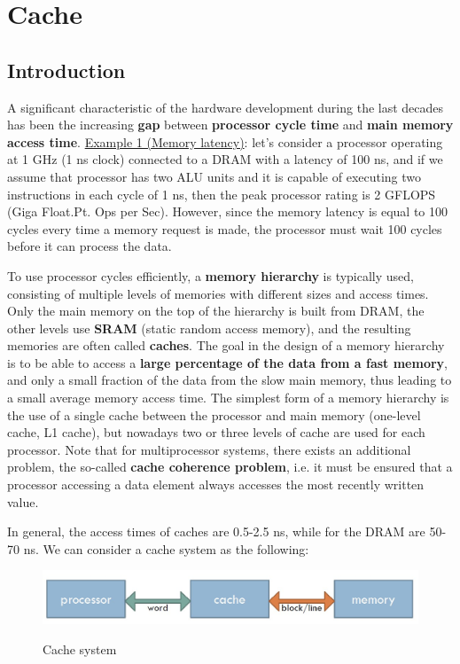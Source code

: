 \newpage
\section{Cache}

\subsection{Introduction}

A significant characteristic of the hardware development during the last decades has been the increasing \textbf{gap} between \textbf{processor cycle time} and \textbf{main memory access time}. 
\underline{Example 1 (Memory latency)}: let's consider a processor operating at 1 GHz (1 ns clock) connected to a DRAM with a latency of 100 ns, and if we assume that processor has two ALU units and it is capable of executing two instructions in each cycle of 1 ns, then the peak processor rating is 2 GFLOPS (Giga Float.Pt. Ops per Sec). However, since the memory latency is equal to 100 cycles every time a memory request is made, the processor must wait 100 cycles before it can process the data.

To use processor cycles efficiently, a \textbf{memory hierarchy} is typically used, consisting of multiple levels of memories with different sizes and access times. Only the main memory on the top of the hierarchy is built from DRAM, the other levels use \textbf{SRAM} (static random access memory), and the resulting memories are often called \textbf{caches}. The goal in the design of a memory hierarchy is to be able to access a \textbf{large percentage of the data from a fast memory}, and only a small fraction of the data from the slow main memory, thus leading to a small average memory access time. The simplest form of a memory hierarchy is the use of a single cache between the processor and main memory (one-level cache, L1 cache), but nowadays two or three levels of cache are used for each processor. Note that for multiprocessor systems, there exists an additional problem, the so-called \textbf{cache coherence problem}, i.e. it must be ensured that a processor accessing a data element always accesses the most recently written value.

In general, the access times of caches are 0.5-2.5 ns, while for the DRAM are 50-70 ns. We can consider a cache system as the following:

\begin{figure}[h!]
		\centering
		\includegraphics[scale = 1.2]{img/cache.jpg}
        \label{cache}
        \caption{Cache system}
\end{figure}

